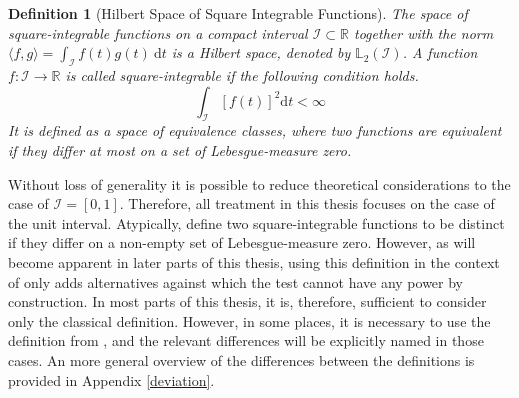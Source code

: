 \documentclass[12pt, a4paper]{article}
\theoremstyle{MAstyle} \newtheorem{assumption}{Assumption}[section]
\theoremstyle{MAstyle} \newtheorem{definition}{Definition}[section]
\theoremstyle{MAstyle} \newtheorem{theorem}{Theorem}[section]
\begin{document}
			\begin{definition}[Hilbert Space of Square Integrable Functions]
				The space of square-integrable functions on a compact interval $\mathcal{I} \subset \mathbb{R}$ together with the norm $\langle f,g\rangle = \int_{\mathcal{I}} f(t)g(t) \ \mathrm{d}t$ is a Hilbert space, denoted by $\mathbb{L}_2(\mathcal{I})$.
				A function $f: \mathcal{I} \rightarrow \mathbb{R}$ is called square-integrable if the following condition holds.
				\begin{equation}
					\int_{\mathcal{I}} \left[f(t)\right]^2\mathrm{d}t < \infty
				\end{equation}
			It is defined as a space of equivalence classes, where two functions are equivalent if they differ at most on a set of Lebesgue-measure zero. 
			\end{definition}
			Without loss of generality it is possible to reduce theoretical considerations to the case of $\mathcal{I} = [0,1]$. Therefore, all treatment in this thesis focuses on the case of the unit interval.
		 	Atypically, \cite{bugni_permutation_2021} define two square-integrable functions to be distinct if they differ on a non-empty set of Lebesgue-measure zero. However, as will become apparent in later parts of this thesis, using this definition in the context of \cite{bugni_permutation_2021} only adds alternatives against which the test cannot have any power by construction. 
			In most parts of this thesis, it is, therefore, sufficient to consider only the classical definition. However, in some places, it is necessary to use the definition from \cite{bugni_permutation_2021}, and the relevant differences will be explicitly named in those cases.
		 	An more general overview of the differences between the definitions is provided in Appendix \ref{deviation}.
\end{document}
